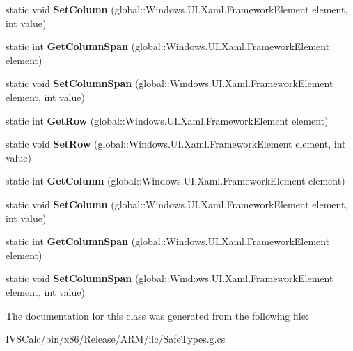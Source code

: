\begin{DoxyCompactItemize}
static void {\bfseries Set\+Column} (global\+::\+Windows.\+U\+I.\+Xaml.\+Framework\+Element element, int value)
\item 
\mbox{\label{class_windows_1_1_u_i_1_1_xaml_1_1_controls_1_1_grid_a166c94be72db2ad46f7ced5642ff2bb1}} 
static int {\bfseries Get\+Column\+Span} (global\+::\+Windows.\+U\+I.\+Xaml.\+Framework\+Element element)
\item 
\mbox{\label{class_windows_1_1_u_i_1_1_xaml_1_1_controls_1_1_grid_afb75a6ca2719689f16cf68ede010bdb2}} 
static void {\bfseries Set\+Column\+Span} (global\+::\+Windows.\+U\+I.\+Xaml.\+Framework\+Element element, int value)
\item 
\mbox{\label{class_windows_1_1_u_i_1_1_xaml_1_1_controls_1_1_grid_a0cf3a18d57c7a539b00d9d58910fc197}} 
static int {\bfseries Get\+Row} (global\+::\+Windows.\+U\+I.\+Xaml.\+Framework\+Element element)
\item 
\mbox{\label{class_windows_1_1_u_i_1_1_xaml_1_1_controls_1_1_grid_a2d87af7c083d5c02d5eb9d3079e6c84f}} 
static void {\bfseries Set\+Row} (global\+::\+Windows.\+U\+I.\+Xaml.\+Framework\+Element element, int value)
\item 
\mbox{\label{class_windows_1_1_u_i_1_1_xaml_1_1_controls_1_1_grid_adeabc44596ae45474187e91cc83b4053}} 
static int {\bfseries Get\+Column} (global\+::\+Windows.\+U\+I.\+Xaml.\+Framework\+Element element)
\item 
\mbox{\label{class_windows_1_1_u_i_1_1_xaml_1_1_controls_1_1_grid_ad85395750dd3aafd10cf1aa7214b4051}} 
static void {\bfseries Set\+Column} (global\+::\+Windows.\+U\+I.\+Xaml.\+Framework\+Element element, int value)
\item 
\mbox{\label{class_windows_1_1_u_i_1_1_xaml_1_1_controls_1_1_grid_a166c94be72db2ad46f7ced5642ff2bb1}} 
static int {\bfseries Get\+Column\+Span} (global\+::\+Windows.\+U\+I.\+Xaml.\+Framework\+Element element)
\item 
\mbox{\label{class_windows_1_1_u_i_1_1_xaml_1_1_controls_1_1_grid_afb75a6ca2719689f16cf68ede010bdb2}} 
static void {\bfseries Set\+Column\+Span} (global\+::\+Windows.\+U\+I.\+Xaml.\+Framework\+Element element, int value)
\end{DoxyCompactItemize}


The documentation for this class was generated from the following file\+:\begin{DoxyCompactItemize}
\item 
I\+V\+S\+Calc/bin/x86/\+Release/\+A\+R\+M/ilc/Safe\+Types.\+g.\+cs\end{DoxyCompactItemize}
